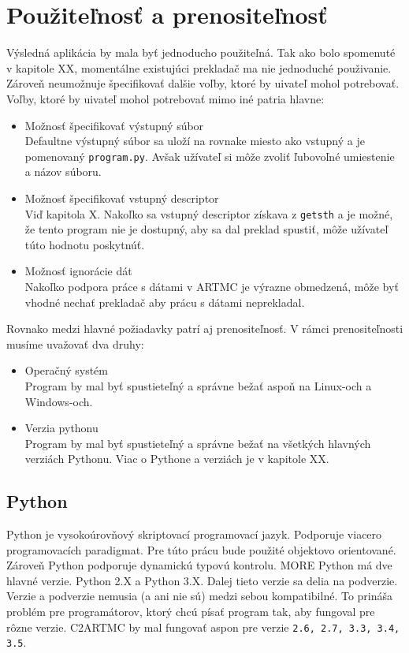 \section{Použiteľnosť a prenositeľnosť}
Výsledná aplikácia by mala byť jednoducho použiteľná. Tak ako bolo spomenuté v
kapitole XX, momentálne existujúci prekladač ma nie jednoduché použivanie. Zároveň
neumožnuje špecifikovať dalšie voľby, ktoré by uivateľ mohol potrebovať. Voľby,
ktoré by uivateľ mohol potrebovať mimo iné patria hlavne:
\begin{itemize}
    \item Možnosť špecifikovať výstupný súbor\\
        Defaultne výstupný súbor sa uloží na rovnake miesto ako vstupný a je
        pomenovaný \texttt{program.py}. Avšak užívateľ si môže zvoliť ľubovoľné umiestenie
        a názov súboru.
    \item Možnosť špecifikovať vstupný descriptor\\
        Viď kapitola X. Nakoľko sa vstupný descriptor získava z \texttt{getsth} a je
        možné, že tento program nie je dostupný, aby sa dal preklad spustiť, môže
        užívateľ túto hodnotu poskytnúť.
    \item Možnosť ignorácie dát\\
        Nakoľko podpora práce s dátami v ARTMC je výrazne obmedzená, môže byť
        vhodné nechať prekladač aby prácu s dátami neprekladal.
\end{itemize}

Rovnako medzi hlavné požiadavky patrí aj prenositeľnosť. V rámci prenositeľnosti
musíme uvažovať dva druhy:
\begin{itemize}
    \item Operačný systém\\
        Program by mal byť spustieteľný a správne bežať aspoň na Linux-och a Windows-och.
    \item Verzia pythonu\\
        Program by mal byť spustieteľný a správne bežať na všetkých hlavných verziách Pythonu.
        Viac o Pythone a verziách je v kapitole XX.
\end{itemize}

\subsection{Python}
Python je vysokoúrovňový skriptovací programovací jazyk. Podporuje viacero programovacích
paradigmat. Pre túto prácu bude použité objektovo orientované. Zároveň Python podporuje
dynamickú typovú kontrolu. MORE
Python má dve hlavné verzie. Python 2.X a Python 3.X. Dalej tieto verzie sa delia na podverzie.
Verzie a podverzie nemusia (a ani nie sú) medzi sebou kompatibilné. To prináša problém
pre programátorov, ktorý chcú písať program tak, aby fungoval pre rôzne verzie.
C2ARTMC by mal fungovať aspon pre verzie \texttt{2.6, 2.7, 3.3, 3.4, 3.5}.

